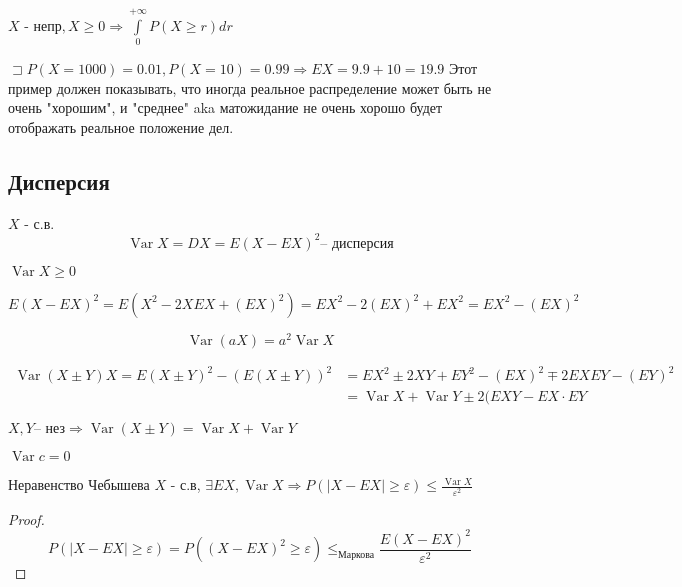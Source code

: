 \documentclass{article}
\DeclareMathOperator{\Var}{Var}
\begin{document}
    \begin{property}
        $X \text{ - непр}, X \ge 0  \Rightarrow \int\limits_0^{+\infty} P(X \ge r) dr$
    \end{property}
    \begin{example}
        $\sqsupset P(X = 1000) = 0.01, P(X = 10) = 0.99 \Rightarrow EX = 9.9 + 10 = 19.9$ 
        Этот пример должен показывать, что иногда реальное распределение может быть не очень "хорошим", и "среднее" aka матожидание не очень хорошо будет отображать реальное положение дел. 
    \end{example}
    \subsection{Дисперсия}
    \begin{definition}
        $X$ - с.в.
        $$ \Var X = DX = E(X-EX)^2 \text{-- дисперсия}$$
    \end{definition}
    \begin{property}
        $ \Var X \ge 0$
    \end{property}
    \begin{property}
        $$E(X-EX)^2 = E(X^2-2XEX + (EX)^2) = EX^2 - 2(EX)^2 + EX^2 = EX^2 - (EX)^2$$
    \end{property}
    \begin{property}
        $$ \Var(aX) = a^2 \Var X $$
    \end{property}
    \begin{property}
         \begin{align*}
         \Var(X \pm Y)X = E(X \pm Y)^2 - (E(X \pm Y))^2 &= EX^2 \pm 2 XY + EY^2 - (EX)^2 \mp 2EXEY - (EY)^2\\ &= \Var X + \Var Y \pm 2 (EXY - EX\cdot EY
         \end{align*}
    \end{property}
    \begin{property}
        $X, Y \text{-- нез} \Rightarrow \Var(X \pm Y) = \Var X + \Var Y$
    \end{property}
    \begin{property}
        $ \Var c = 0$
    \end{property}
    \begin{theorem}{Неравенство Чебышева}
        $X$ - с.в, $\exists EX, \Var X \Rightarrow P(|X-EX|\ge\varepsilon) \le\frac{\Var X}{\varepsilon^2}$
        \begin{proof}
            $$P(|X-EX|\ge\varepsilon) = P((X-EX)^2 \ge \varepsilon) \le_{\text{Маркова}} \frac{E(X-EX)^2}{\varepsilon^2} $$
        \end{proof}
    \end{theorem}
\end{document}
